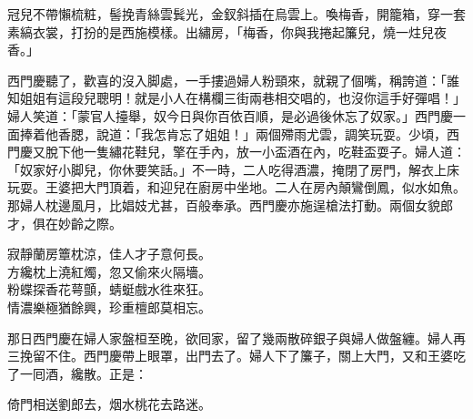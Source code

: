 \begin{myquote} 
冠兒不帶懶梳粧，髻挽青絲雲鬂光，金釵斜插在烏雲上。喚梅香，開籠箱，穿一套素縞衣裳，打扮的是西施模樣。出繡房，「梅香，你與我捲起簾兒，燒一炷兒夜香。」{}
\end{myquote} 

西門慶聽了，歡喜的沒入脚處，一手摟過婦人粉頸來，就親了個嘴，稱誇道：「誰知姐姐有這段兒聰明！就是小人在構欄三街兩巷相交唱的，也沒你這手好彈唱！」婦人笑道：「蒙官人擡舉，奴今日與你百依百順，是必過後休忘了奴家。」西門慶一面捧着他香腮，說道：「我怎肯忘了姐姐！」兩個殢雨尤雲，調笑玩耍。少頃，西門慶又脫下他一隻繡花鞋兒，擎在手內，放一小盃酒在內，吃鞋盃耍子。{}婦人道：「奴家好小脚兒，你休要笑話。」不一時，二人吃得酒濃，掩閉了房門，解衣上床玩耍。王婆把大門頂着，和迎兒在廚房中坐地。二人在房內顛鸞倒鳳，似水如魚。那婦人枕邊風月，比娼妓尤甚，百般奉承。西門慶亦施逞槍法打動。兩個女貌郎才，俱在妙齡之際。

\begin{myquote} 
寂靜蘭房簟枕涼，佳人才子意何長。\\方纔枕上澆紅燭，忽又偷來火隔墻。\\粉蝶探香花萼顫，蜻蜓戲水徃來狂。\\情濃樂極猶餘興，珍重檀郎莫相忘。
\end{myquote} 

那日西門慶在婦人家盤桓至晚，欲囘家，留了幾兩散碎銀子與婦人做盤纏。婦人再三挽留不住。西門慶帶上眼罩，出門去了。婦人下了簾子，關上大門，又和王婆吃了一囘酒，纔散。正是：

\begin{myquote} 
倚門相送劉郎去，烟水桃花去路迷。
\end{myquote} 

